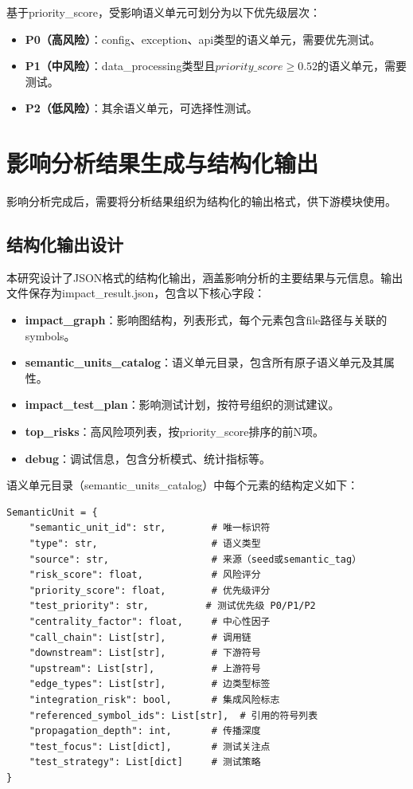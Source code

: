 基于priority\_score，受影响语义单元可划分为以下优先级层次：
\begin{itemize}
    \item \textbf{P0（高风险）}：config、exception、api类型的语义单元，需要优先测试。
    \item \textbf{P1（中风险）}：data\_processing类型且$priority\_score \geq 0.52$的语义单元，需要测试。
    \item \textbf{P2（低风险）}：其余语义单元，可选择性测试。
\end{itemize}

\section{影响分析结果生成与结构化输出}

影响分析完成后，需要将分析结果组织为结构化的输出格式，供下游模块使用。

\subsection{结构化输出设计}
本研究设计了JSON格式的结构化输出，涵盖影响分析的主要结果与元信息。输出文件保存为\textsf{impact\_result.json}，包含以下核心字段：

\begin{itemize}
    \item \textbf{impact\_graph}：影响图结构，列表形式，每个元素包含file路径与关联的symbols。
    \item \textbf{semantic\_units\_catalog}：语义单元目录，包含所有原子语义单元及其属性。
    \item \textbf{impact\_test\_plan}：影响测试计划，按符号组织的测试建议。
    \item \textbf{top\_risks}：高风险项列表，按priority\_score排序的前N项。
    \item \textbf{debug}：调试信息，包含分析模式、统计指标等。
\end{itemize}

语义单元目录（semantic\_units\_catalog）中每个元素的结构定义如下：

\begin{lstlisting}
SemanticUnit = {
    "semantic_unit_id": str,        # 唯一标识符
    "type": str,                    # 语义类型
    "source": str,                  # 来源（seed或semantic_tag）
    "risk_score": float,            # 风险评分
    "priority_score": float,        # 优先级评分
    "test_priority": str,          # 测试优先级 P0/P1/P2
    "centrality_factor": float,     # 中心性因子
    "call_chain": List[str],        # 调用链
    "downstream": List[str],        # 下游符号
    "upstream": List[str],          # 上游符号
    "edge_types": List[str],        # 边类型标签
    "integration_risk": bool,       # 集成风险标志
    "referenced_symbol_ids": List[str],  # 引用的符号列表
    "propagation_depth": int,       # 传播深度
    "test_focus": List[dict],       # 测试关注点
    "test_strategy": List[dict]     # 测试策略
}
\end{lstlisting}

